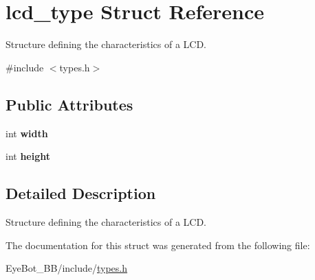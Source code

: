 \hypertarget{structlcd__type}{\section{lcd\-\_\-type \-Struct \-Reference}
\label{structlcd__type}
}


\-Structure defining the characteristics of a \-L\-C\-D.  




{\ttfamily \#include $<$types.\-h$>$}

\subsection*{\-Public \-Attributes}
\begin{DoxyCompactItemize}
\item 
\hypertarget{structlcd__type_a722761befb000ef385b2fbec01fb8d2b}{int {\bfseries width}}\label{structlcd__type_a722761befb000ef385b2fbec01fb8d2b}

\item 
\hypertarget{structlcd__type_a8a11efce695e427f0fd3e1a290b5dc5b}{int {\bfseries height}}\label{structlcd__type_a8a11efce695e427f0fd3e1a290b5dc5b}

\end{DoxyCompactItemize}


\subsection{\-Detailed \-Description}
\-Structure defining the characteristics of a \-L\-C\-D. 

\-The documentation for this struct was generated from the following file\-:\begin{DoxyCompactItemize}
\item 
\-Eye\-Bot\-\_\-\-B\-B/include/\hyperlink{types_8h}{types.\-h}\end{DoxyCompactItemize}
